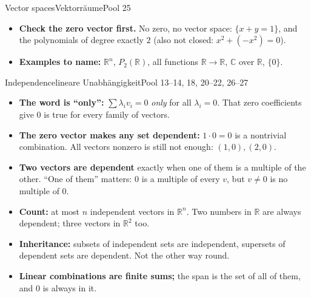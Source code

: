 \documentclass{kaelearn}
\begin{document}
\begin{panel}[unbreakable]{Vector spaces}{Vektorräume}{Pool 25}
\begin{itemize}
  \item \textbf{Check the zero vector first.} No zero, no vector space: $\{x+y=1\}$, and the
        polynomials of degree exactly $2$ (also not closed: $x^2+(-x^2)=0$).
  \item \textbf{Examples to name:} $\mathbb R^n$, $P_2(\mathbb R)$, all functions
        $\mathbb R\to\mathbb R$, $\mathbb C$ over $\mathbb R$, $\{0\}$.
\end{itemize}
\end{panel}

\begin{panel}[unbreakable]{Independence}{lineare Unabhängigkeit}{Pool 13--14, 18, 20--22, 26--27}
\begin{itemize}
  \item \textbf{The word is ``only'':} $\sum\lambda_iv_i=0$ \emph{only} for all $\lambda_i=0$.
        That zero coefficients give $0$ is true for every family of vectors.
  \item \textbf{The zero vector makes any set dependent:} $1\cdot0=0$ is a nontrivial combination.
        All vectors nonzero is still not enough: $(1,0),(2,0)$.
  \item \textbf{Two vectors are dependent} exactly when one of them is a multiple of the other.
        ``One of them'' matters: $0$ is a multiple of every $v$, but $v\neq0$ is no multiple of $0$.
  \item \textbf{Count:} at most $n$ independent vectors in $\mathbb R^n$. Two numbers in
        $\mathbb R$ are always dependent; three vectors in $\mathbb R^2$ too.
  \item \textbf{Inheritance:} subsets of independent sets are independent, supersets of dependent
        sets are dependent. Not the other way round.
  \item \textbf{Linear combinations are finite sums;} the span is the set of all of them, and $0$
        is always in it.
\end{itemize}
\end{panel}
\end{document}
